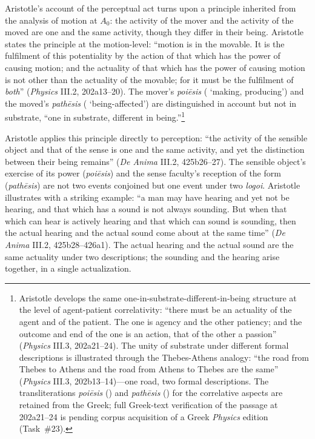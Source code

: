 Aristotle's account of the perceptual act turns upon a principle inherited from the analysis of motion at $A_0$: the activity of the mover and the activity of the moved are one and the same activity, though they differ in their being. Aristotle states the principle at the motion-level: ``motion is in the movable. It is the fulfilment of this potentiality by the action of that which has the power of causing motion; and the actuality of that which has the power of causing motion is not other than the actuality of the movable; for it must be the fulfilment of \textit{both}'' (\textit{Physics} III.2, 202a13--20). The mover's \textit{poiēsis} ( `making, producing') and the moved's \textit{pathēsis} ( `being-affected') are distinguished in account but not in substrate, ``one in substrate, different in being.''\footnote{Aristotle develops the same one-in-substrate-different-in-being structure at the level of agent-patient correlativity: ``there must be an actuality of the agent and of the patient. The one is agency and the other patiency; and the outcome and end of the one is an action, that of the other a passion'' (\textit{Physics} III.3, 202a21--24). The unity of substrate under different formal descriptions is illustrated through the Thebes-Athens analogy: ``the road from Thebes to Athens and the road from Athens to Thebes are the same'' (\textit{Physics} III.3, 202b13--14)---one road, two formal descriptions. The transliterations \textit{poiēsis} () and \textit{pathēsis} () for the correlative aspects are retained from the Greek; full Greek-text verification of the passage at 202a21--24 is pending corpus acquisition of a Greek \textit{Physics} edition (Task~\#23).}

Aristotle applies this principle directly to perception: ``the activity of the sensible object and that of the sense is one and the same activity, and yet the distinction between their being remains'' (\textit{De Anima} III.2, 425b26--27). The sensible object's exercise of its power (\textit{poiēsis}) and the sense faculty's reception of the form (\textit{pathēsis}) are not two events conjoined but one event under two \textit{logoi}. Aristotle illustrates with a striking example: ``a man may have hearing and yet not be hearing, and that which has a sound is not always sounding. But when that which can hear is actively hearing and that which can sound is sounding, then the actual hearing and the actual sound come about at the same time'' (\textit{De Anima} III.2, 425b28--426a1). The actual hearing and the actual sound are the same actuality under two descriptions; the sounding and the hearing arise together, in a single actualization.

